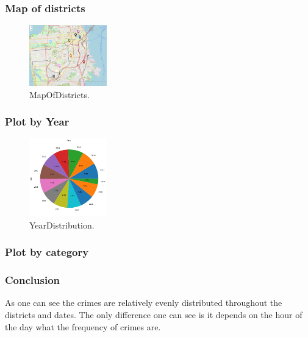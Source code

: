 \documentclass[../Main.tex]{subfiles}
\begin{document}
\subsubsection{Map of districts}
\begin{figure}[H]
\centering
\includegraphics[width=0.3\textwidth]{Resources/MapOfDistricts.png}
\caption{\label{fig:MapOfDistricts}MapOfDistricts.}
\end{figure}

\subsubsection{Plot by Year}
\begin{figure}[H]
\centering
\includegraphics[width=0.3\textwidth]{Resources/YearDistribution.png}
\caption{\label{fig:YearDistribution}YearDistribution.}
\end{figure}

\subsubsection{Plot by category}


\subsubsection{Conclusion}
As one can see the crimes are relatively evenly distributed throughout the districts and dates. The only difference one can see is it depends on the hour of the day what the frequency of crimes are. 
\end{document}
